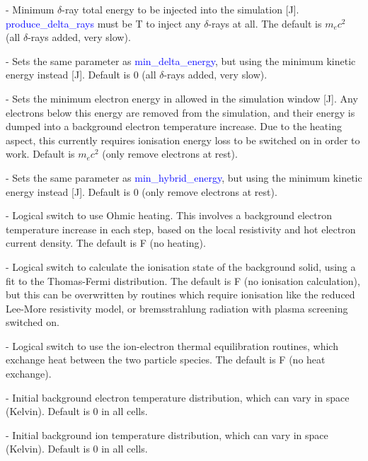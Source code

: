 \documentclass[12pt]{article}
\numberwithin{equation}{section}
\begin{document}
\bigskip {\large\textcolor{blue}{min\_delta\_energy}} - Minimum $\delta$-ray total energy to be injected into the simulation [J]. \textcolor{blue}{produce\_delta\_rays} must be T to inject any $\delta$-rays at all. The default is $m_e c^2$ (all $\delta$-rays added, very slow).

\bigskip {\large\textcolor{blue}{min\_delta\_KE}} - Sets the same parameter as \textcolor{blue}{min\_delta\_energy}, but using the minimum kinetic energy instead [J]. Default is 0 (all $\delta$-rays added, very slow).

\bigskip {\large\textcolor{blue}{min\_hybrid\_energy}} - Sets the minimum electron energy in allowed in the simulation window [J]. Any electrons below this energy are removed from the simulation, and their energy is dumped into a background electron temperature increase. Due to the heating aspect, this currently requires ionisation energy loss to be switched on in order to work. Default is $m_e c^2$ (only remove electrons at rest).

\bigskip {\large\textcolor{blue}{min\_hybrid\_KE}} - Sets the same parameter as \textcolor{blue}{min\_hybrid\_energy}, but using the minimum kinetic energy instead [J]. Default is 0 (only remove electrons at rest).

\bigskip {\large\textcolor{blue}{use\_ohmic\_heating}} - Logical switch to use Ohmic heating. This involves a background electron temperature increase in each step, based on the local resistivity and hot electron current density. The default is F (no heating).

\bigskip {\large\textcolor{blue}{use\_thomas\_fermi}} - Logical switch to calculate the ionisation state of the background solid, using a fit to the Thomas-Fermi distribution. The default is F (no ionisation calculation), but this can be overwritten by routines which require ionisation like the reduced Lee-More resistivity model, or bremsstrahlung radiation with plasma screening switched on.

\bigskip {\large\textcolor{blue}{use\_ion\_temp}} - Logical switch to use the ion-electron thermal equilibration routines, which exchange heat between the two particle species. The default is F (no heat exchange).

\bigskip {\large\textcolor{blue}{electron\_temperature}} - Initial background electron temperature distribution, which can vary in space (Kelvin). Default is 0 in all cells.

\bigskip {\large\textcolor{blue}{ion\_temperature}} - Initial background ion temperature distribution, which can vary in space (Kelvin). Default is 0 in all cells.
\end{document}
